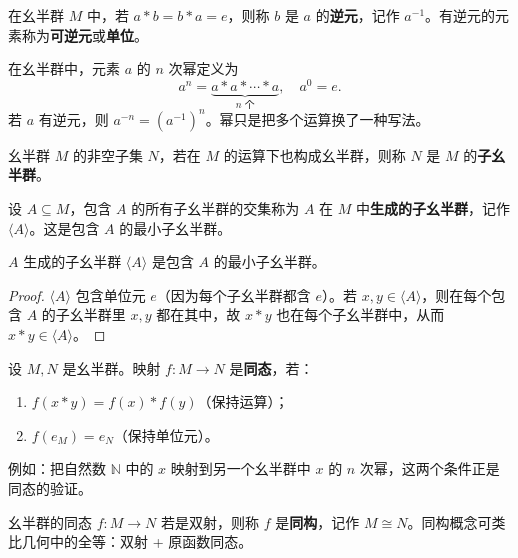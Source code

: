 \begin{definition}[逆元（定义 1.8）]
在幺半群 $M$ 中，若 $a * b = b * a = e$，则称 $b$ 是 $a$ 的\textbf{逆元}，记作 $a^{-1}$。有逆元的元素称为\textbf{可逆元}或\textbf{单位}。
\end{definition}

\begin{definition}[幺半群中的幂（定义 1.3）]
在幺半群中，元素 $a$ 的 $n$ 次幂定义为
\[
  a^n = \underbrace{a * a * \cdots * a}_{n \text{ 个}}, \quad a^0 = e.
\]
若 $a$ 有逆元，则 $a^{-n} = (a^{-1})^n$。幂只是把多个运算换了一种写法。
\end{definition}

\begin{definition}[子幺半群（定义 1.4）]
幺半群 $M$ 的非空子集 $N$，若在 $M$ 的运算下也构成幺半群，则称 $N$ 是 $M$ 的\textbf{子幺半群}。
\end{definition}

\begin{definition}[由子集生成的子幺半群（定义 1.6）]
设 $A \subseteq M$，包含 $A$ 的所有子幺半群的交集称为 $A$ 在 $M$ 中\textbf{生成的子幺半群}，记作 $\langle A \rangle$。这是包含 $A$ 的最小子幺半群。
\end{definition}

\begin{proposition}[命题 1.5]
$A$ 生成的子幺半群 $\langle A \rangle$ 是包含 $A$ 的最小子幺半群。
\end{proposition}

\begin{proof}
$\langle A \rangle$ 包含单位元 $e$（因为每个子幺半群都含 $e$）。若 $x, y \in \langle A \rangle$，则在每个包含 $A$ 的子幺半群里 $x, y$ 都在其中，故 $x * y$ 也在每个子幺半群中，从而 $x * y \in \langle A \rangle$。
\end{proof}

\begin{definition}[幺半群的同态（定义 1.5）]
设 $M, N$ 是幺半群。映射 $f\colon M \to N$ 是\textbf{同态}，若：
\begin{enumerate}
  \item $f(x * y) = f(x) * f(y)$（保持运算）；
  \item $f(e_M) = e_N$（保持单位元）。
\end{enumerate}
例如：把自然数 $\mathbb{N}$ 中的 $x$ 映射到另一个幺半群中 $x$ 的 $n$ 次幂，这两个条件正是同态的验证。
\end{definition}

\begin{definition}[幺半群的同构（定义 1.7）]
幺半群的同态 $f\colon M \to N$ 若是双射，则称 $f$ 是\textbf{同构}，记作 $M \cong N$。同构概念可类比几何中的全等：双射 + 原函数同态。
\end{definition}

